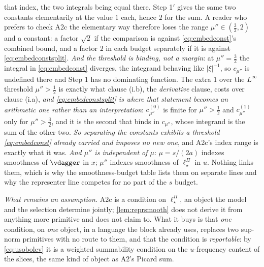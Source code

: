 \begin{remark}
that index, the two integrals being equal there. Step 1$'$ gives the same two constants elementarily at
the value $1$ each, hence $2$ for the sum. A reader who prefers to check A2c the elementary way therefore
loses the range $\mu''\in(\tfrac32,2)$ and a constant: a factor $\sqrt2$ if the comparison is against
\eqref{eq:embedconst}'s combined bound, and a factor $2$ in each budget separately if it is against
\eqref{eq:embedconstsplit}.
\emph{And the threshold is binding, not a margin}: at $\mu''=\tfrac32$ the integral in
\eqref{eq:embedconst} diverges, the integrand behaving like $|\xi|^{-1}$, so $c_{\mu''}$ is undefined
there and Step 1 has no dominating function. The extra $1$ over the $L^{\infty}$ threshold $\mu''>\tfrac12$
is exactly what clause (i.b), the \emph{derivative} clause, costs over clause (i.a),
\emph{and \eqref{eq:embedconstsplit} is where that statement becomes an arithmetic one rather than an
interpretation}: $c^{(0)}_{\mu''}$ is finite for $\mu''>\tfrac12$ and $c^{(1)}_{\mu''}$ only for
$\mu''>\tfrac32$, and it is the second that binds in $c_{\mu''}$, whose integrand is the sum of the
other two. \emph{So separating the constants exhibits a threshold \eqref{eq:embedconst} already carried
and imposes no new one}, and A2c's index range is exactly what it was.
\emph{And $\mu''$ is independent of $\mu$}: $\mu=s/(2a)$ indexes
smoothness of $\vdagger$ in $x$; $\mu''$ indexes smoothness of $\ell^\Pi_\star$ in $u$. Nothing links
them, which is why the smoothness-budget table lists them on separate lines and why the representer line
competes for no part of the $s$ budget.

\emph{What remains an assumption.} A2c is a condition on $\ell^\Pi_\star$, an object the model and the
selection determine jointly; \cref{lem:reprsmooth} does not derive it from anything more primitive and
does not claim to. What it buys is that \emph{one} condition, on \emph{one} object, in a language the
block already uses, replaces two sup-norm primitives with no route to them, and that the condition is
\emph{reportable}: by \eqref{eq:usobolev} it is a weighted summability condition on the $u$-frequency
content of the slices, the same kind of object as A2's Picard sum.
\end{remark}

